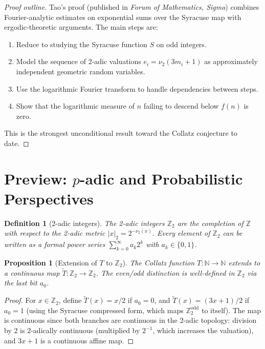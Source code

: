 \documentclass[12pt,a4paper]{article}
\newtheorem{proposition}[theorem]{Proposition}
\newtheorem{definition}[theorem]{Definition}
\begin{document}
\begin{proof}[Proof outline]
Tao's proof \cite{Tao2022} (published in \emph{Forum of Mathematics, Sigma})
combines Fourier-analytic estimates on exponential sums
over the Syracuse map with ergodic-theoretic arguments. The main steps are:
\begin{enumerate}
  \item Reduce to studying the Syracuse function $S$ on odd integers.
  \item Model the sequence of 2-adic valuations $e_i = \nu_2(3m_i+1)$ as approximately
        independent geometric random variables.
  \item Use the logarithmic Fourier transform to handle dependencies between steps.
  \item Show that the logarithmic measure of $n$ failing to descend below $f(n)$ is zero.
\end{enumerate}
This is the strongest unconditional result toward the Collatz conjecture to date.
\end{proof}

\section{Preview: $p$-adic and Probabilistic Perspectives}\label{sec:padic_preview}

\begin{definition}[2-adic integers]\label{def:2adic}
The \emph{2-adic integers} $\mathbb{Z}_2$ are the completion of $\mathbb{Z}$ with respect
to the 2-adic metric $|x|_2 = 2^{-\nu_2(x)}$. Every element of $\mathbb{Z}_2$ can be written
as a formal power series $\sum_{k=0}^\infty a_k 2^k$ with $a_k \in \{0,1\}$.
\end{definition}

\begin{proposition}[Extension of $T$ to $\mathbb{Z}_2$]\label{prop:extension}
The Collatz function $T\colon \mathbb{N} \to \mathbb{N}$ extends to a continuous map
$\tilde{T}\colon \mathbb{Z}_2 \to \mathbb{Z}_2$. The even/odd distinction is well-defined
in $\mathbb{Z}_2$ via the last bit $a_0$.
\end{proposition}

\begin{proof}
For $x \in \mathbb{Z}_2$, define $\tilde{T}(x) = x/2$ if $a_0 = 0$, and
$\tilde{T}(x) = (3x+1)/2$ if $a_0 = 1$ (using the Syracuse compressed form, which maps
$\mathbb{Z}_2^{\text{odd}}$ to itself). The map is continuous since both branches are
continuous in the 2-adic topology: division by 2 is $2$-adically continuous (multiplied
by $2^{-1}$, which increases the valuation), and $3x+1$ is a continuous affine map.
\end{proof}
\end{document}
